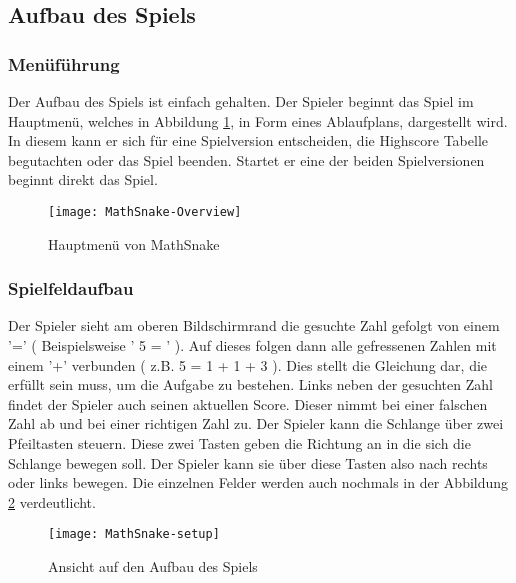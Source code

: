 \subsection{Aufbau des Spiels}
\subsubsection{Menüführung}
Der Aufbau des Spiels ist einfach gehalten. Der Spieler beginnt das Spiel im Hauptmenü, welches in Abbildung \ref{fig:mathsnake-menu}, in Form eines Ablaufplans, dargestellt wird. In diesem kann er sich für eine Spielversion entscheiden, die Highscore Tabelle begutachten oder das Spiel beenden. Startet er eine der beiden Spielversionen beginnt direkt das Spiel. 
\begin{figure}[htb]
	\centering
	\texttt{[image: MathSnake-Overview]}
	\caption{Hauptmenü von MathSnake\label{fig:mathsnake-menu}}
\end{figure}
\subsubsection{Spielfeldaufbau}
Der Spieler sieht am oberen Bildschirmrand die gesuchte Zahl gefolgt von einem '=' ( Beispielsweise ' 5 = ' ). Auf dieses folgen dann alle gefressenen Zahlen mit einem '+' verbunden ( z.B. 5 = 1 + 1 + 3 ). Dies stellt die Gleichung dar, die erfüllt sein muss, um die Aufgabe zu bestehen. Links neben der gesuchten Zahl findet der Spieler auch seinen aktuellen Score. Dieser nimmt bei einer falschen Zahl ab und bei einer richtigen Zahl zu. Der Spieler kann die Schlange über zwei Pfeiltasten steuern. Diese zwei Tasten geben die Richtung an in die sich die Schlange bewegen soll. Der Spieler kann sie über diese Tasten also nach rechts oder links bewegen. Die einzelnen Felder werden auch nochmals in der Abbildung \ref{fig:mathsnake-setup} verdeutlicht.
\begin{figure}[htb]
	\centering
	\texttt{[image: MathSnake-setup]}
	\caption{Ansicht auf den Aufbau des Spiels\label{fig:mathsnake-setup}}
\end{figure}
